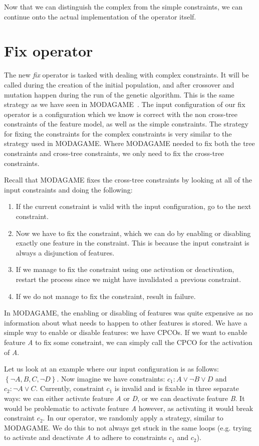 Now that we can distinguish the complex from the simple constraints, we can
continue onto the actual implementation of the operator itself.

\section{Fix operator}
The new \emph{fix} operator is tasked with dealing with complex constraints.
It will be called during the creation of the initial population, and after
crossover and mutation happen during the run of the genetic algorithm. This
is the same strategy as we have seen in MODAGAME~\cite{pascual2015modagame}.
The input configuration of our fix operator is a configuration which we know
is correct with the non cross-tree constraints of the feature model, as well
as the simple constraints. The strategy for fixing the constraints for the
complex constraints is very similar to the strategy used in MODAGAME. Where
MODAGAME needed to fix both the tree constraints and cross-tree constraints,
we only need to fix the cross-tree constraints.

Recall that MODAGAME fixes the cross-tree constraints by looking at all of
the input constraints and doing the following:
\begin{enumerate}
    \item If the current constraint is valid with the input configuration,
          go to the next constraint.
    \item Now we have to fix the constraint, which we can do by enabling or
          disabling exactly one feature in the constraint. This is because the
          input constraint is always a disjunction of features.
    \item If we manage to fix the constraint using one activation or
          deactivation, restart the process since we might have invalidated a previous
          constraint.
    \item If we do not manage to fix the constraint, result in failure.
\end{enumerate}

In MODAGAME, the enabling or disabling of features was quite expensive as no
information about what needs to happen to other features is stored. We 
have a simple way to enable or disable features: we have CPCOs. If we want to
enable feature \emph{A} to fix some constraint, we can simply call the CPCO for
the activation of \emph{A}.

Let us look at an example where our input configuration is as follows:
\( \left\{ \neg A, B, C, \neg D \right\} \). Now imagine we have constraints:
\(c_1: A \lor \neg B \lor D \) and \(c_2: \neg A \lor C \). 
Currently, constraint $c_1$ is invalid and is fixable
in three separate ways: we can either activate feature \emph{A} or \emph{D}, or
we can deactivate feature \emph{B}. It would be problematic to activate feature
\emph{A} however, as activating it would break constraint $c_2$. In our operator,
we randomly apply a strategy, similar to MODAGAME. We do this to not always get
stuck in the same loops (e.g. trying to activate and deactivate \emph{A} to adhere
to constraints $c_1$ and $c_2$).

